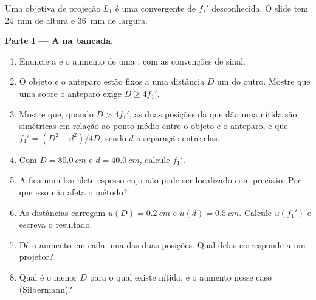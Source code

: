 \begin{problem}
\label{pb:b1:mirrors-thin-lenses:1}
Uma objetiva de projeção $L_1$ é uma  convergente de 
$f_1'$ desconhecida. O slide tem \qty{24}{mm} de altura e \qty{36}{mm} de largura.

\medskip
\noindent\textbf{Parte I --- A  na bancada.}
\begin{enumerate}
  \item Enuncie a  e o aumento de uma , com as convenções de sinal.
  \item O objeto e o anteparo estão fixos a uma distância $D$ um do outro. Mostre que uma
         sobre o anteparo exige $D \geq 4f_1'$.
  \item Mostre que, quando $D > 4f_1'$, as duas posições da  que dão uma
         nítida são simétricas em relação ao ponto médio entre
        o objeto e o anteparo, e que $f_1' = (D^2 - d^2)/4D$, sendo $d$
        a separação entre elas.
  \item Com $D = \qty{80.0}{cm}$ e $d = \qty{40.0}{cm}$, calcule
        $f_1'$.
  \item A  fica num barrilete espesso cujo  não pode ser
        localizado com precisão. Por que isso não afeta o método?
  \item As distâncias carregam $u(D) = \qty{0.2}{cm}$ e
        $u(d) = \qty{0.5}{cm}$. Calcule $u(f_1')$ e escreva o resultado.
  \item Dê o aumento em cada uma das duas posições. Qual delas
        corresponde a um projetor?
  \item Qual é o menor $D$ para o qual existe  nítida, e o
        aumento nesse caso (Silbermann)?
\end{enumerate}


\end{problem}
